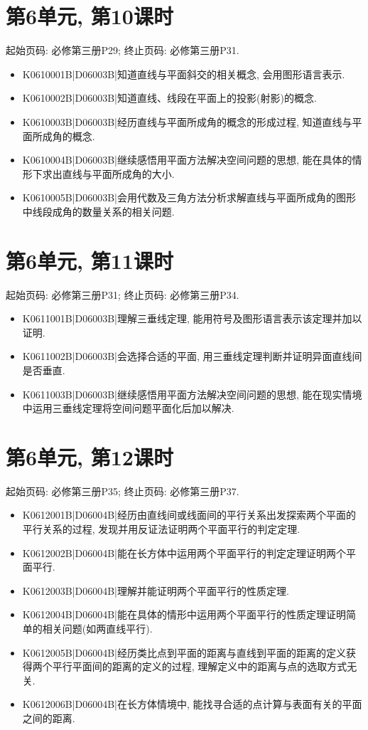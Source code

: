 \section*{第6单元, 第10课时}
起始页码: 必修第三册P29; 终止页码: 必修第三册P31.
\begin{itemize}
\item K0610001B|D06003B|知道直线与平面斜交的相关概念, 会用图形语言表示.
\item K0610002B|D06003B|知道直线、线段在平面上的投影(射影)的概念.
\item K0610003B|D06003B|经历直线与平面所成角的概念的形成过程, 知道直线与平面所成角的概念.
\item K0610004B|D06003B|继续感悟用平面方法解决空间问题的思想, 能在具体的情形下求出直线与平面所成角的大小.
\item K0610005B|D06003B|会用代数及三角方法分析求解直线与平面所成角的图形中线段成角的数量关系的相关问题.
\end{itemize}

\section*{第6单元, 第11课时}
起始页码: 必修第三册P31; 终止页码: 必修第三册P34.
\begin{itemize}
\item K0611001B|D06003B|理解三垂线定理, 能用符号及图形语言表示该定理并加以证明.
\item K0611002B|D06003B|会选择合适的平面, 用三垂线定理判断并证明异面直线间是否垂直.
\item K0611003B|D06003B|继续感悟用平面方法解决空间问题的思想, 能在现实情境中运用三垂线定理将空间问题平面化后加以解决.
\end{itemize}

\section*{第6单元, 第12课时}
起始页码: 必修第三册P35; 终止页码: 必修第三册P37.
\begin{itemize}
\item K0612001B|D06004B|经历由直线间或线面间的平行关系出发探索两个平面的平行关系的过程, 发现并用反证法证明两个平面平行的判定定理.
\item K0612002B|D06004B|能在长方体中运用两个平面平行的判定定理证明两个平面平行.
\item K0612003B|D06004B|理解并能证明两个平面平行的性质定理.
\item K0612004B|D06004B|能在具体的情形中运用两个平面平行的性质定理证明简单的相关问题(如两直线平行).
\item K0612005B|D06004B|经历类比点到平面的距离与直线到平面的距离的定义获得两个平行平面间的距离的定义的过程, 理解定义中的距离与点的选取方式无关.
\item K0612006B|D06004B|在长方体情境中, 能找寻合适的点计算与表面有关的平面之间的距离.
\end{itemize}

